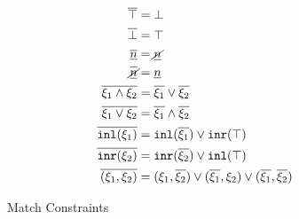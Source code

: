 \begin{figure}[t]
\begin{minipage}[t][][b]{.62\linewidth}
\begin{mathpar}
\end{mathpar}
\end{minipage}%
\begin{minipage}[t][][b]{.3\linewidth}
\begin{align*}
  \cdual{\ctruth} &= \cfalsity \\
  \cdual{\cfalsity} &= \ctruth \\
  \cdual{\cnum{n}} &= \cnotnum{n} \\
  \cdual{\cnotnum{n}} &= \cnum{n} \\
  \cdual{\cand{\xi_1}{\xi_2}} &= \cor{\cdual{\xi_1}}{\cdual{\xi_2}} \\
  \cdual{\cor{\xi_1}{\xi_2}} &= \cand{\cdual{\xi_1}}{\cdual{\xi_2}} \\
  \cdual{\cinl{\xi_1}} &= \cor{ \cinl{\cdual{\xi_1}} }{ \cinr{\ctruth} } \\
  \cdual{\cinr{\xi_2}} &= \cor{ \cinr{\cdual{\xi_2}} }{ \cinl{\ctruth} } \\
  \cdual{\cpair{\xi_1}{\xi_2}} &=
  \cor{ \cor{ 
    \cpair{\xi_1}{\cdual{\xi_2}}
  }{
    \cpair{\cdual{\xi_1}}{\xi_2}
  }}{
    \cpair{\cdual{\xi_1}}{\cdual{\xi_2}}
  }
\end{align*}
\end{minipage}
  \caption{Match Constraints}
  \label{fig:constraint}
\end{figure}
